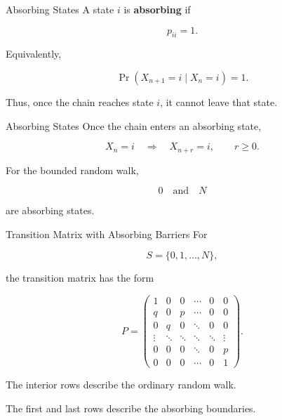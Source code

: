 \documentclass[
  ignorenonframetext,
  aspectratio=169,
]{beamer}
\begin{document}
\begin{frame}{Absorbing States}
\protect{}\label{absorbing-states}
A state \(i\) is \textbf{absorbing} if

\[
\boxed{p_{ii}=1.}
\]

Equivalently,

\[
\Pr(X_{n+1}=i\mid X_n=i)=1.
\]

Thus, once the chain reaches state \(i\), it cannot leave that state.
\end{frame}

\begin{frame}{Absorbing States}
\protect{}\label{absorbing-states-1}
Once the chain enters an absorbing state,

\[
X_n=i
\quad\Longrightarrow\quad
X_{n+r}=i,
\qquad r\geq0.
\]

For the bounded random walk,

\[
0
\quad\text{and}\quad
N
\]

are absorbing states.
\end{frame}

\begin{frame}{Transition Matrix with Absorbing Barriers}
\protect{}\label{transition-matrix-with-absorbing-barriers}
For

\[
S=\{0,1,\ldots,N\},
\]

the transition matrix has the form

\[
P=
\begin{pmatrix}
1&0&0&\cdots&0&0\\
q&0&p&\cdots&0&0\\
0&q&0&\ddots&0&0\\
\vdots&\ddots&\ddots&\ddots&\ddots&\vdots\\
0&0&0&\ddots&0&p\\
0&0&0&\cdots&0&1
\end{pmatrix}.
\]

The interior rows describe the ordinary random walk.

The first and last rows describe the absorbing boundaries.
\end{frame}
\end{document}

